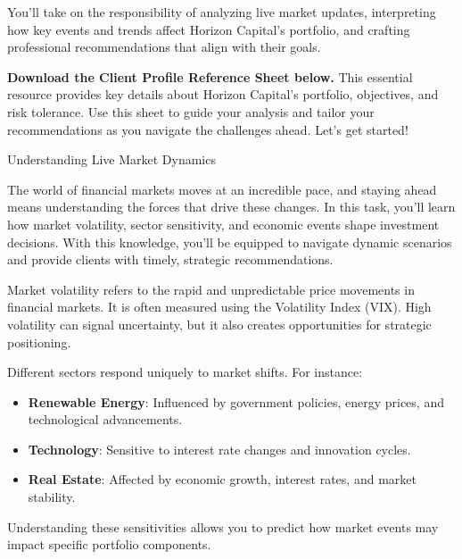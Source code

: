 \documentclass[11pt]{article}
\begin{document}


You'll take on the responsibility of analyzing live market updates,
interpreting how key events and trends affect Horizon Capital's portfolio, and
crafting professional recommendations that align with their goals.

\textbf{Download the Client Profile Reference Sheet below.} This essential
resource provides key details about Horizon Capital's portfolio, objectives,
and risk tolerance. Use this sheet to guide your analysis and tailor your
recommendations as you navigate the challenges ahead. Let's get started!\par\medskip


\newpage
{\fontsize{26}{30}\selectfont Understanding Live Market Dynamics}\par\bigskip

The world of financial markets moves at an incredible pace, and staying ahead
means understanding the forces that drive these changes. In this task, you'll
learn how market volatility, sector sensitivity, and economic events shape
investment decisions. With this knowledge, you'll be equipped to navigate
dynamic scenarios and provide clients with timely, strategic recommendations.


Market volatility refers to the rapid and unpredictable price movements in
financial markets. It is often measured using the Volatility Index (VIX). High
volatility can signal uncertainty, but it also creates opportunities for
strategic positioning.

Different sectors respond uniquely to market shifts. For instance:
\begin{itemize}[leftmargin=1.5em, itemsep=2pt]
  \item \textbf{Renewable Energy}: Influenced by government policies, energy
  prices, and technological advancements.
  \item \textbf{Technology}: Sensitive to interest rate changes and innovation
  cycles.
  \item \textbf{Real Estate}: Affected by economic growth, interest rates, and
  market stability.
\end{itemize}
Understanding these sensitivities allows you to predict how market events may
impact specific portfolio components.
\end{document}
